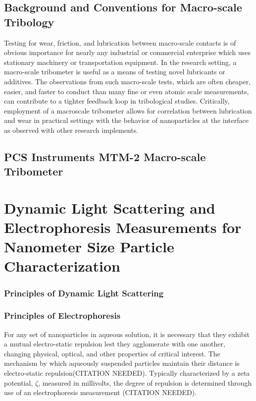 \subsection{Background and Conventions for Macro-scale Tribology}

Testing for wear, friction, and lubrication between macro-scale contacts is of obvious importance for nearly any industrial or commercial enterprise which uses stationary machinery or transportation equipment. In the research setting, a macro-scale tribometer is useful as a means of testing novel lubricants or additives. The observations from such macro-scale tests, which are often cheaper, easier, and faster to conduct than many fine or even atomic scale measurements, can contribute to a tighter feedback loop in tribological studies. Critically, employment of a macroscale tribometer allows for correlation between lubrication and wear in practical settings with the behavior of nanoparticles at the interface as observed with other research implements.


\subsection{PCS Instruments MTM-2 Macro-scale Tribometer}



\section{Dynamic Light Scattering and Electrophoresis Measurements for Nanometer Size Particle Characterization}





\subsubsection{Principles of Dynamic Light Scattering}



\subsubsection{Principles of Electrophoresis}

For any set of nanoparticles in aqueous solution, it is necessary that they exhibit a mutual electro-static repulsion lest they agglomerate with one another, changing physical, optical, and other properties of critical interest. The mechanism by which aqueously suspended particles maintain their distance is electro-static repulsion(CITATION NEEDED). Typically characterized by a zeta potential, $\zeta$, measured in millivolts, the degree of repulsion is determined through use of an electrophoresis measurement (CITATION NEEDED).

